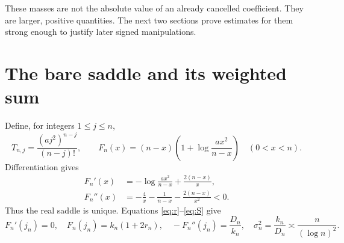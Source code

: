 \documentclass[11pt,a4paper]{article}
\numberwithin{equation}{section}
\theoremstyle{definition}\newtheorem{definition}[theorem]{Definition}
\theoremstyle{remark}\newtheorem{remark}[theorem]{Remark}
\theoremstyle{definition}
\begin{document}
These masses are not the absolute value of an already cancelled coefficient.
They are larger, positive quantities. The next two sections prove estimates
for them strong enough to justify later signed manipulations.

\section{The bare saddle and its weighted sum}
\label{sec:bare}

Define, for integers \(1\le j\le n\),
\begin{equation}
 T_{n,j}=\frac{(aj^2)^{n-j}}{(n-j)!},\qquad
 F_n(x)=(n-x)\left(1+\log\frac{ax^2}{n-x}\right)
 \quad(0<x<n).
 \label{eq:T}
\end{equation}
Differentiation gives
\begin{align}
 F_n'(x)&=-\log\frac{ax^2}{n-x}+\frac{2(n-x)}x,\label{eq:Fprime}\\
 F_n''(x)&=-\frac4x-\frac1{n-x}-\frac{2(n-x)}{x^2}<0.
 \label{eq:Fsecond}
\end{align}
Thus the real saddle is unique. Equations \eqref{eq:r}--\eqref{eq:S} give
\begin{equation}
 F_n'(j_n)=0,\quad F_n(j_n)=k_n(1+2r_n),\quad
 -F_n''(j_n)=\frac{D_n}{k_n},\quad
 \sigma_n^2=\frac{k_n}{D_n}\asymp\frac{n}{(\log n)^2}.
 \label{eq:baresaddle}
\end{equation}
\end{document}
